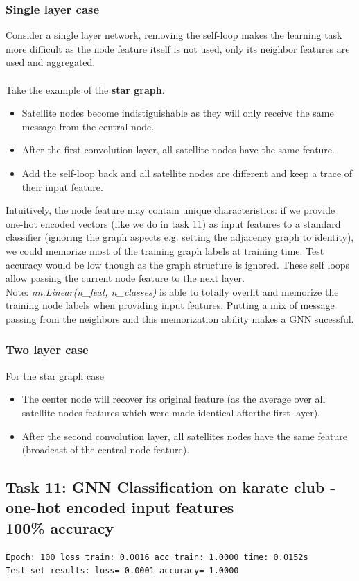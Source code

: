 \documentclass[a4paper]{article}
\begin{document}
\subsubsection*{Single layer case}
Consider a single layer network, removing the self-loop makes the learning task more difficult as the node feature itself is not used, only its neighbor features are used and aggregated.
\\
\\
Take the example of the \textbf{star graph}. 
\begin{itemize}
    \item Satellite nodes become indistiguishable as they will only receive the same message from the central node. 
    \item After the first convolution layer, all satellite nodes have the same feature.
    \item Add the self-loop back and all satellite nodes are different and keep a trace of their input feature.
\end{itemize}

Intuitively, the node feature may contain unique characteristics: 
if we provide one-hot encoded vectors (like we do in task 11) as input features to a standard classifier (ignoring the graph aspects e.g. setting the adjacency graph to identity),
we could memorize most of the training graph labels at training time. Test accuracy would be low though as the graph structure is ignored.
These self loops allow passing the current node feature to the next layer.\\
Note: \textit{nn.Linear(n\_feat, n\_classes)} is able to totally overfit and memorize the training node labels when providing input features.
Putting a mix of message passing from the neighbors and this memorization ability makes a GNN sucessful.

\subsubsection*{Two layer case}
For the star graph case
\begin{itemize}
    \item The center node will recover its original feature (as the average over all satellite nodes features which were made identical afterthe first layer).
    \item After the second convolution layer, all satellites nodes have the same feature (broadcast of the central node feature).
\end{itemize}
\subsection*{Task 11: GNN Classification on karate club - one-hot encoded input features \\ 100\% accuracy}
\begin{verbatim}
Epoch: 100 loss_train: 0.0016 acc_train: 1.0000 time: 0.0152s
Test set results: loss= 0.0001 accuracy= 1.0000
\end{verbatim}
\end{document}
